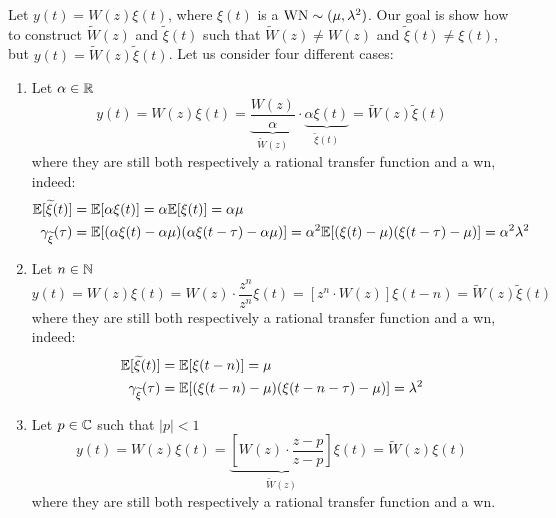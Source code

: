 Let $y(t)=W(z)\xi(t)$, where $\xi(t)$ is a $\operatorname{WN}\sim(\mu,\lambda^2)$. Our goal is show how to construct $\tilde{W}(z)$ and $\tilde{\xi}(t)$ such that $\tilde{W}(z)\neq W(z)$ and $\tilde{\xi}(t)\neq \xi(t)$, but $y(t)=\tilde W(z)\tilde\xi(t)$. Let us consider four different cases:
\begin{enumerate}
	\item 
	Let $\alpha \in \mathbb{R}$
	\[
		y(t)=W(z) \xi(t) = \underbrace{\frac{W(z)}{\alpha}}_{\tilde{W}(z)} \cdot \underbrace{\alpha \xi(t)}_{\tilde{\xi}(t)} = \tilde{W}(z)\tilde{\xi}(t)
	\]
	where they are still both respectively a rational transfer function and a \gls{wn}, indeed:
	\begin{align*}
		\mathbb{E}[\widetilde{\xi}(t)]&=\mathbb{E}[\alpha \xi(t)]=\alpha \mathbb{E}[\xi(t)]=\alpha \mu\\
		\gamma_{\widetilde{\xi}}(\tau)&=\mathbb{E}[(\alpha\xi(t)-\alpha\mu)(\alpha \xi(t-\tau)-\alpha \mu)]=\alpha^2 \mathbb{E}[(\xi(t)-\mu)( \xi(t-\tau)- \mu)] = \alpha^2\lambda^2
	\end{align*}

	\item 
	Let $n \in \mathbb{N}$
	\[
		y(t)=W(z) \xi(t)=W(z) \cdot \frac{z^{n}}{z^{n}} \xi(t)=\left[z^{n} \cdot W(z)\right] \xi(t-n)=\tilde{W}(z) \tilde{\xi}(t)
	\]
	where they are still both respectively a rational transfer function and a \gls{wn}, indeed:
	\begin{align*}
		\mathbb{E}[\widetilde{\xi}(t)]&=\mathbb{E}[\xi(t-n)]=\mu \\
		\gamma_{\widetilde{\xi}}(\tau)&=\mathbb{E}[(\xi(t-n)-\mu)(\xi(t-n-\tau)-\mu)]=\lambda^2
	\end{align*}

	\item 
	Let $p \in \mathbb{C}$ such that $|p|<1$
	\[
		y(t)=W(z) \xi(t) = \underbrace{\left[W(z) \cdot \frac{z-p}{z-p}\right]}_{\tilde{W}(z)} \xi(t)=\tilde{W}(z) \xi(t)
	\]
	where they are still both respectively a rational transfer function and a \gls{wn}.


\end{enumerate}
